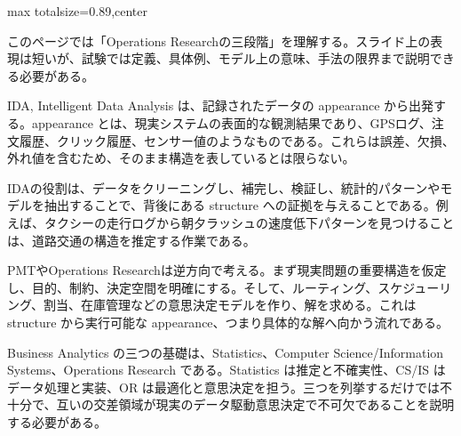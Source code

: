 \begin{minipage}[t]{0.58\textwidth}
\begin{adjustbox}{max totalsize={\textwidth}{0.89\textheight},center}
\begin{minipage}{\textwidth}\scriptsize
{}このページでは「Operations Researchの三段階」を理解する。スライド上の表現は短いが、試験では定義、具体例、モデル上の意味、手法の限界まで説明できる必要がある。\par
IDA, Intelligent Data Analysis は、記録されたデータの appearance から出発する。appearance とは、現実システムの表面的な観測結果であり、GPSログ、注文履歴、クリック履歴、センサー値のようなものである。これらは誤差、欠損、外れ値を含むため、そのまま構造を表しているとは限らない。\par
IDAの役割は、データをクリーニングし、補完し、検証し、統計的パターンやモデルを抽出することで、背後にある structure への証拠を与えることである。例えば、タクシーの走行ログから朝夕ラッシュの速度低下パターンを見つけることは、道路交通の構造を推定する作業である。\par
PMTやOperations Researchは逆方向で考える。まず現実問題の重要構造を仮定し、目的、制約、決定空間を明確にする。そして、ルーティング、スケジューリング、割当、在庫管理などの意思決定モデルを作り、解を求める。これは structure から実行可能な appearance、つまり具体的な解へ向かう流れである。\par
Business Analytics の三つの基礎は、Statistics、Computer Science/Information Systems、Operations Research である。Statistics は推定と不確実性、CS/IS はデータ処理と実装、OR は最適化と意思決定を担う。三つを列挙するだけでは不十分で、互いの交差領域が現実のデータ駆動意思決定で不可欠であることを説明する必要がある。\par

\end{minipage}
\end{adjustbox}
\end{minipage}

